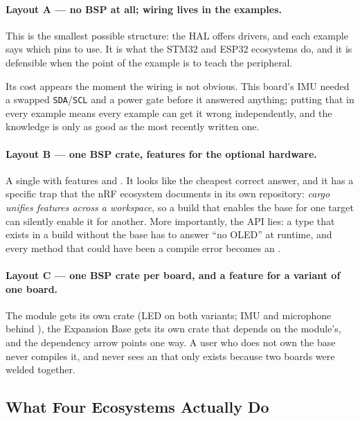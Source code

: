 \paragraph{Layout A — no BSP at all; wiring lives in the examples.}
This is the smallest possible structure: the HAL offers drivers, and each example says which
pins to use. It is what the STM32 and ESP32 ecosystems do, and it is defensible when the point
of the example is to teach the peripheral.

Its cost appears the moment the wiring is not obvious. This board's IMU needed a swapped
\texttt{SDA}/\texttt{SCL} and a power gate before it answered anything; putting that in every
example means every example can get it wrong independently, and the knowledge is only as good
as the most recently written one.

\paragraph{Layout B — one BSP crate, features for the optional hardware.}
A single \allowbreak{} with features
 and . It looks like the cheapest correct answer, and it has a specific
trap that the nRF ecosystem documents in its own repository: \emph{cargo unifies features
across a workspace}, so a build that enables the base for one target can silently enable it
for another. More importantly, the API lies: a  type that exists in a
build without the base has to answer ``no OLED'' at runtime, and every method that could have
been a compile error becomes an .

\paragraph{Layout C — one BSP crate per board, and a feature for a variant of one board.}
The module gets its own crate (LED on both variants; IMU and microphone behind
), the Expansion Base gets its own crate that depends on the module's, and
the dependency arrow points one way. A user who does not own the base never compiles it, and
never sees an  that only exists because two boards were welded together.

\subsection{What Four Ecosystems Actually Do}

